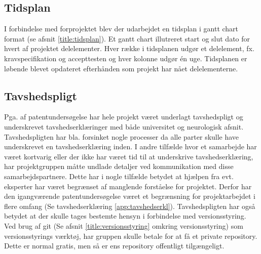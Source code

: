 \subsection{Tidsplan}
I forbindelse med forprojektet blev der udarbejdet en tidsplan i gantt chart format (se afsnit \ref{title:tidsplan}). Et gantt chart illutreret start og slut dato for hvert af projektet delelementer. Hver række i tidsplanen udgør et delelement, fx. kravspecifikation og accepttesten og hver kolonne udgør én uge. Tidsplanen er løbende blevet opdateret efterhånden som projekt har nået delelementerne. 

\subsection{Tavshedspligt} \label{title:tavshedspligt}
Pga. af patentundersøgelse har hele projekt været underlagt tavshedspligt og underskrevet tavshedserklæringer med både universitet og neurologisk afsnit. Tavshedspligten har bla. forsinket nogle processer da alle parter skulle have underskrevet en tavshedserklæring inden. I andre tilfælde hvor et samarbejde har været kortvarig eller der ikke har været tid til at underskrive tavshedserklæring, har projektgruppen måtte undlade detaljer ved kommunikation med disse samarbejdspartnere. Dette har i nogle tilfælde betydet at hjælpen fra evt. eksperter har været begrænset af manglende forståelse for projektet.  Derfor har den igangværende patentundersøgelse været et begrænsning for projektarbejdet i flere omfang (Se tavshedserklæring \ref{app:tavshedserkl}).
Tavshedspligten har også betydet at der skulle tages bestemte hensyn i forbindelse med versionsstyring. Ved brug af git (Se afsnit \ref{title:versionsstyring} omkring versionsstyring) som versionsstyrings værktøj, har gruppen skulle betale for at få et private repository. Dette er normal gratis, men så er ens repository offentligt tilgængeligt. 


